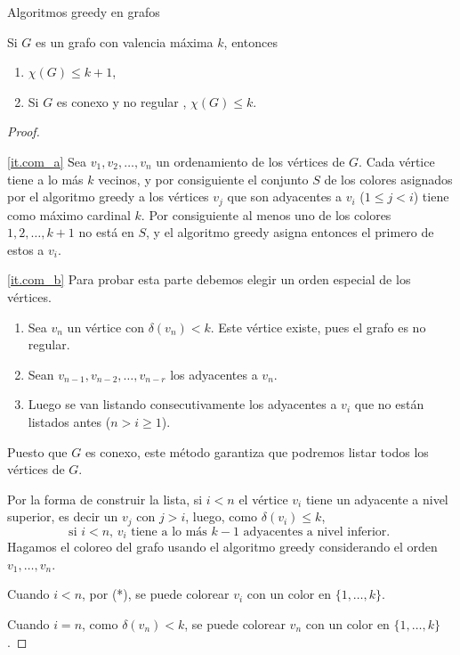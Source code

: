 \begin{section}{Algoritmos greedy en grafos}
\begin{teorema}\label{t5.7.1} Si $G$ es un grafo con valencia máxima
$k$, entonces
\begin{enumerate}[label=\textit{\alph*)}]
\item\label{it.com_a}  $\chi(G)\le k+1$,
\item\label{it.com_b} Si $G$ es conexo y no regular , $\chi(G) \le k$.
\end{enumerate}
\end{teorema}
\begin{proof}
    
    \

\ref{it.com_a} Sea $v_1,v_2,\ldots,v_n$ un ordenamiento de los vértices de $G$. Cada vértice tiene a lo más $k$ vecinos, y por consiguiente el conjunto $S$ de los colores asignados por el algoritmo greedy a los vértices $v_j$ que son adyacentes a $v_i$ ($1\le j <i$) tiene como máximo cardinal $k$. Por consiguiente al
menos uno de los colores $1,2,\dots,k+1$ no está en $S$, y el algoritmo greedy asigna entonces el primero de estos a $v_i$.

\ref{it.com_b} Para probar esta parte debemos elegir un orden especial de los vértices. 
\begin{enumerate}[label=\arabic*.]
    \item Sea $v_n$ un vértice con $\delta(v_n) < k$. Este vértice existe, pues el grafo es no regular. 
    \item Sean $v_{n-1},v_{n-2},\ldots,v_{n-r}$ los adyacentes a $v_n$.
    \item Luego se van listando consecutivamente los adyacentes a $v_i$  que no están listados antes ($n > i \ge 1$). 
\end{enumerate}   

Puesto que $G$ es conexo, este método garantiza que  podremos listar todos los vértices de $G$.

Por  la forma de construir la lista, si $i < n$ el vértice $v_i$ tiene un adyacente a nivel superior,  es decir un $v_j$ con $j >i$, luego, como $\delta(v_i) \le k$, 
\begin{equation*}
  \text{si $i< n$, $v_i$ tiene  a lo más $k-1$ adyacentes a nivel inferior.  }  \tag{*}
\end{equation*}
Hagamos el coloreo del grafo usando el algoritmo greedy  considerando el orden $v_1, \ldots, v_n$. 

Cuando $i < n$,   por (*), se puede colorear $v_i$ con un color en $\{1,\ldots,k\}$.

Cuando $i=n$,  como $\delta(v_n)<k$, se puede colorear $v_n$  con un color en $\{1,\ldots,k\}$.


\end{proof}
\end{section}
